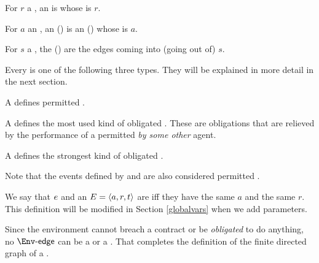 \documentclass[12pt]{article}
\begin{document}
\begin{LPPI}
\item For $r$ a \Role, an  is \atransition whose \Role is $r$.
\item For $a$ an \Action, an  () is an \Event (\transition) whose \Action is $a$.
\item For $s$ a \State, the  () are the edges coming into (going out of) $s$.
\end{LPPI}
Every \transition is one of the following three types. They will be explained in more detail in the next section.
\begin{LPPI}
\item A  defines permitted \Events.
\item A  defines the most used kind of obligated \Events. These are obligations that are relieved by the performance of a permitted {\Event} {\it by some other} agent.
\item A  defines the strongest kind of obligated \Events.
\end{LPPI}
Note that the events defined by \rmustntrans and \mustntrans are also considered permitted \Events.

We say that \atransition $e$ and an \Event $E = \langle a,r,t\rangle$ are  iff they have the same \Action $a$ and the same \Role $r$. This definition will be modified in Section \ref{globalvars} when we add \Event parameters.
\medskip





Since the environment \Env cannot breach a contract or be {\it obligated} to do anything, no $\depTrans{\Env}$ can be a \mustntran or a \rmustntran.
That completes the definition of the finite directed graph \skeleton of a \Contract.

\medskip
\end{document}
